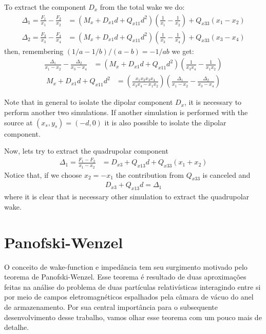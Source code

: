 To extract the component $D_x$ from the total wake we do:
\begin{align}
\Delta_1 = \frac{F_1}{x_1} - \frac{F_2}{x_2} &= \left(M_x  +  D_{x1}d  +  Q_{x11}d^2\right)\left(\frac{1}{x_1}-\frac{1}{x_2}\right) + Q_{x33}(x_1-x_2) \\
\Delta_2 = \frac{F_3}{x_3} - \frac{F_4}{x_4} &= \left(M_x  +  D_{x1}d  +  Q_{x11}d^2\right)\left(\frac{1}{x_3}-\frac{1}{x_4}\right) + Q_{x33}(x_3-x_4)
\end{align}
then, remembering $(1/a-1/b)/(a-b) = -1/ab$ we get:
\begin{align}
	\frac{\Delta_1}{x_1-x_2} - \frac{\Delta_2}{x_3-x_4} &= \left(M_x  +  D_{x1} d  +  Q_{x11} d^2\right)\left(\frac{1}{x_3x_4} - \frac{1}{x_1x_2}\right)
\end{align}
\begin{align}
	M_x  +  D_{x1} d +  Q_{x11} d^2 &= \left(\frac{x_1x_2x_3x_4}{x_3x_4 - x_1x_2}\right)\left(\frac{\Delta_1}{x_1-x_2} - \frac{\Delta_2}{x_3-x_4}\right)
\end{align}

Note that in general to isolate the dipolar component $D_x$, it is necessary to perform another two simulations. If another simulation is performed with the source at $(x_s,y_s) = (-d,0)$ it is also possible to isolate the dipolar component.

Now, lets try to extract the quadrupolar component
\begin{align}
\Delta_1 = \frac{F_1 - F_2}{x_1-x_2} &= D_{x3} + Q_{x13}d + Q_{x33}(x_1 + x_2)
\end{align}
Notice that, if we choose $x_2=-x_1$ the contribution from $Q_{x33}$ is canceled and
\begin{align}
	D_{x3} + Q_{x13}d = \Delta_1
\end{align}
where it is clear that is necessary other simulation to extract the quadrupolar wake.

\section{Panofski-Wenzel}

O conceito de wake-function e impedância tem seu surgimento motivado pelo teorema de Panofski-Wenzel. Esse teorema é resultado de duas aproximações feitas na análise do problema de duas partículas relativísticas interagindo entre si por meio de campos eletromagnéticos espalhados pela câmara de vácuo do anel de armazenamento. Por sua central importância para o subsequente desenvolvimento desse trabalho, vamos olhar esse teorema com um pouco mais de detalhe.

